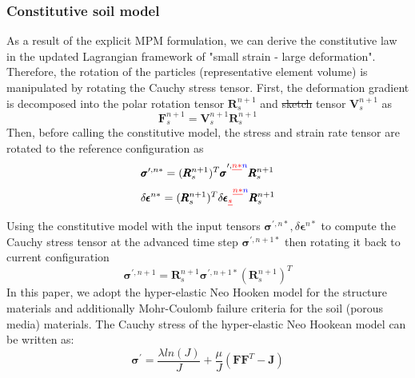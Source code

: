 \documentclass[preprint,12pt]{elsarticle}
\providecommand{\DIFadd}[1]{{\protect\color{blue}\uwave{#1}}} %
\providecommand{\DIFdel}[1]{{\protect\color{red}\sout{#1}}}                      %
\providecommand{\DIFaddbegin}{} %
\providecommand{\DIFaddend}{} %
\providecommand{\DIFdelbegin}{} %
\providecommand{\DIFdelend}{} %
\newcommand{\DIFscaledelfig}{0.5}
\newlength{\DIFdelgraphicswidth} %
\newlength{\DIFdelgraphicsheight} %
\newcommand{\DIFaddincludegraphics}[2][]{{\color{blue}\fbox{\DIFOincludegraphics[#1]{#2}}}} %
\newcommand{\DIFdelincludegraphics}[2][]{%
\sbox{\DIFdelgraphicsbox}{\DIFOincludegraphics[#1]{#2}}%
\settoboxwidth{\DIFdelgraphicswidth}{\DIFdelgraphicsbox} %
\settoboxtotalheight{\DIFdelgraphicsheight}{\DIFdelgraphicsbox} %
\scalebox{\DIFscaledelfig}{%
\parbox[b]{\DIFdelgraphicswidth}{\usebox{\DIFdelgraphicsbox}\\[-\baselineskip] \rule{\DIFdelgraphicswidth}{0em}}\llap{\resizebox{\DIFdelgraphicswidth}{\DIFdelgraphicsheight}{%
\setlength{\unitlength}{\DIFdelgraphicswidth}%
\begin{picture}(1,1)%
\thicklines\linethickness{2pt} %
{\color[rgb]{1,0,0}\put(0,0){\framebox(1,1){}}}%
{\color[rgb]{1,0,0}\put(0,0){\line( 1,1){1}}}%
{\color[rgb]{1,0,0}\put(0,1){\line(1,-1){1}}}%
\end{picture}%
}\hspace*{3pt}}} %
} %
\DeclareRobustCommand{\DIFaddbegin}{\DIFOaddbegin \let\includegraphics\DIFaddincludegraphics} %
\DeclareRobustCommand{\DIFaddend}{\DIFOaddend \let\includegraphics\DIFOincludegraphics} %
\DeclareRobustCommand{\DIFdelbegin}{\DIFOdelbegin \let\includegraphics\DIFdelincludegraphics} %
\DeclareRobustCommand{\DIFdelend}{\DIFOaddend \let\includegraphics\DIFOincludegraphics} %
\begin{document}
\subsubsection{Constitutive soil model}
As a result of the explicit MPM formulation, we can derive the constitutive law in the updated Lagrangian framework of "small strain - large deformation". Therefore, the rotation of the particles (representative element volume) is manipulated by rotating the Cauchy stress tensor. First, the deformation gradient is decomposed into the polar rotation tensor $\pmb{R}_s^{n+1}$ and \DIFdelbegin \DIFdel{sketch }\DIFdelend \DIFaddbegin \DIFadd{stretch }\DIFaddend tensor $\pmb{V}_s^{n+1}$ as\DIFaddbegin \DIFadd{:
}\DIFaddend %
%
\begin{equation}
     \pmb{F}_s^{n+1} = \pmb{V}_s^{n+1} \pmb{R}_s^{n+1}
\end {equation}
%
%
Then, before calling the constitutive model, the stress and strain rate tensor are rotated to the reference configuration as\DIFaddbegin \DIFadd{:
}\DIFaddend %
%
\begin{equation}
     \pmb{\sigma}^{\prime,n*} =  (\pmb{R}_s^{n+1})^T \pmb{\sigma}^{\prime,\DIFdelbegin \DIFdel{n*}\DIFdelend \DIFaddbegin \DIFadd{n}\DIFaddend } \pmb{R}_s^{n+1}
\end {equation}
%
%
\begin{equation}
    \delta \pmb{\epsilon}^{n*} =  (\pmb{R}_s^{n+1})^T \delta \pmb{\epsilon}\DIFdelbegin \DIFdel{_s}\DIFdelend ^{\DIFdelbegin \DIFdel{n*}\DIFdelend \DIFaddbegin \DIFadd{n}\DIFaddend } \pmb{R}_s^{n+1}
\end {equation}
%
%
Using the constitutive model with the input tensors $\pmb{\sigma}^{\prime,n*}, \delta \pmb{\epsilon}^{n*}$ to compute the Cauchy stress tensor at the advanced time step $\pmb{\sigma}^{\prime,n+1*}$ then rotating it back to current configuration \DIFaddbegin \DIFadd{as:
}\DIFaddend %
%
\begin{equation}
    \pmb{\sigma}^{\prime,n+1} =  \pmb{R}_s^{n+1} \pmb{\sigma}^{\prime,n+1*} (\pmb{R}_s^{n+1})^T
\end {equation}
%
%
In this paper, we adopt the hyper-elastic Neo Hooken model for the structure materials and additionally Mohr-Coulomb failure criteria for the soil (porous media) materials. The Cauchy stress of the hyper-elastic Neo Hookean model can be written as:
%
%
\begin{equation}
    \pmb{\sigma}^{\prime} =  \frac{ \lambda ln(J)}{J} + \frac{\mu}{J} (\pmb{F} \pmb{F}^T - \pmb{J})
\end {equation}
\end{document}
